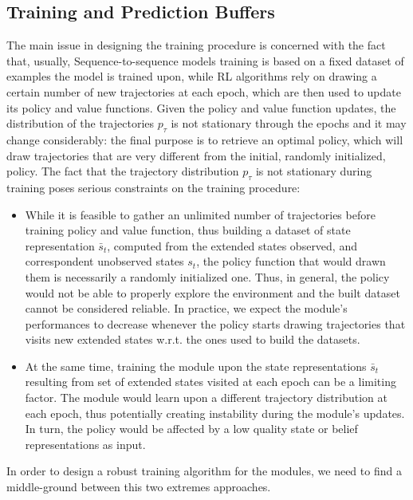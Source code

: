         \subsection{Training and Prediction Buffers}
        \label{sub:dtrpo_buffers}
            The main issue in designing the training procedure is concerned with the fact that, usually, Sequence-to-sequence models training is based on a fixed dataset of examples the model is trained upon, while RL algorithms rely on drawing a certain number of new trajectories at each epoch, which are then used to update its policy and value functions. Given the policy and value function updates, the distribution of the trajectories $p_{\tau}$ is not stationary through the epochs and it may change considerably: the final purpose is to retrieve an optimal policy, which will draw trajectories that are very different from the initial, randomly initialized, policy.
            The fact that the trajectory distribution $p_{\tau}$ is not stationary during training poses serious constraints on the training procedure:
            \begin{itemize}
                \setlength\itemsep{0.05em}
                \item While it is feasible to gather an unlimited number of trajectories before training policy and value function, thus building a dataset of state representation $\bar{s}_t$, computed from the extended states observed, and correspondent unobserved states $s_t$, the policy function that would drawn them is necessarily a randomly initialized one. Thus, in general, the policy would not be able to properly explore the environment and the built dataset cannot be considered reliable. In practice, we expect the module's performances to decrease whenever the policy starts drawing trajectories that visits new extended states w.r.t. the ones used to build the datasets.
                \item At the same time, training the module upon the state representations $\bar{s}_t$ resulting from set of extended states visited at each epoch can be a limiting factor. The module would learn upon a different trajectory distribution at each epoch, thus potentially creating instability during the module's updates. In turn, the policy would be affected by a low quality state or belief representations as input.
            \end{itemize}
            \noindent
            In order to design a robust training algorithm for the modules, we need to find a middle-ground between this two extremes approaches.
            
